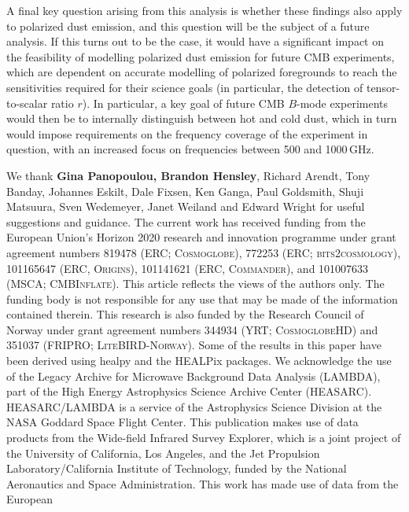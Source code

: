 \documentclass{aa}
\begin{document}
A final key question arising from this analysis is whether these
findings also apply to polarized dust emission, and this question will
be the subject of a future analysis. If this turns out to be the case,
it would have a significant impact on the feasibility of modelling
polarized dust emission for future CMB experiments, which are
dependent on accurate modelling of polarized foregrounds to reach the
sensitivities required for their science goals (in particular, the
detection of tensor-to-scalar ratio $r$). In particular, a key goal of future CMB $B$-mode
experiments would then be to internally distinguish between hot and
cold dust, which in turn would impose requirements on the frequency
coverage of the experiment in question, with an increased focus on
frequencies between 500 and 1000\,GHz.

\begin{acknowledgements}
    We thank \textbf{Gina Panopoulou, Brandon Hensley}, Richard Arendt, Tony
    Banday, Johannes Eskilt, Dale Fixsen, Ken Ganga, Paul Goldsmith, Shuji
    Matsuura, Sven Wedemeyer, Janet Weiland and Edward Wright for
  useful suggestions and guidance.  The current work has received
  funding from the European Union’s Horizon 2020 research and
  innovation programme under grant agreement numbers 819478 (ERC;
  \textsc{Cosmoglobe}), 772253 (ERC; \textsc{bits2cosmology}),
  101165647 (ERC, \textsc{Origins}), 101141621 (ERC,
  \textsc{Commander}), and 101007633 (MSCA; \textsc{CMBInflate}).
  This article reflects the views of the authors only. The funding
  body is not responsible for any use that may be made of the
  information contained therein. This research is
  also funded by the Research Council of Norway under grant agreement
  numbers 344934 (YRT; \textsc{CosmoglobeHD}) and 351037 (FRIPRO;
  \textsc{LiteBIRD-Norway}). Some of the results in this paper have been
  derived using healpy \citep{Zonca2019} and the HEALPix
  \citep{healpix} packages.  We acknowledge the use of the Legacy
  Archive for Microwave Background Data Analysis (LAMBDA), part of the
  High Energy Astrophysics Science Archive Center
  (HEASARC). HEASARC/LAMBDA is a service of the Astrophysics Science
  Division at the NASA Goddard Space Flight Center. This publication
  makes use of data products from the Wide-field Infrared Survey
  Explorer, which is a joint project of the University of California,
  Los Angeles, and the Jet Propulsion Laboratory/California Institute
  of Technology, funded by the National Aeronautics and Space
  Administration. This work has made use of data from the European

\end{acknowledgements}
\end{document}
